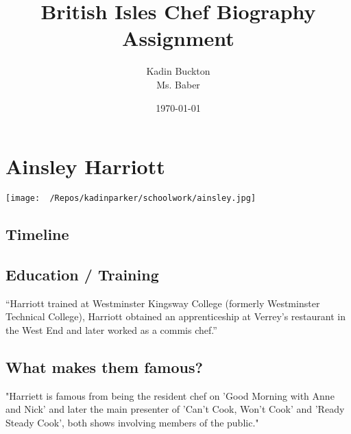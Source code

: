 \documentclass[11pt]{article}
\author{Kadin Buckton \\ Ms. Baber}
\date{\today}
\title{British Isles Chef Biography Assignment}
\begin{document}
\maketitle
\setlength{\parindent}{0em}
\section*{Ainsley Harriott}
\label{sec:org1f9e05f}

\texttt{[image: ~/Repos/kadinparker/schoolwork/ainsley.jpg]}

\subsection*{Timeline}
\label{sec:org721bff2}




\subsection*{Education / Training}
\label{sec:orga1247ca}

``Harriott trained at Westminster Kingsway College (formerly Westminster Technical College), Harriott obtained an apprenticeship at Verrey's restaurant in the West End and later worked as a commis chef.''\cite{wikipedia}


\subsection*{What makes them famous?}
\label{sec:orga8f7d72}

"Harriett is famous from being the resident chef on 'Good Morning with Anne and Nick' and later the main presenter of 'Can't Cook, Won't Cook' and 'Ready Steady Cook', both shows involving members of the public."\cite{wikipedia}
\end{document}

